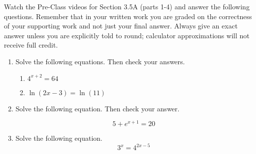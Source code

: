 


\noindent Watch the Pre-Class videos for Section 3.5A (parts 1-4) and answer the following questions. Remember that in your written work you are graded on the correctness of your supporting work and not just your final answer. Always give an exact answer unless you are explicitly told to round; calculator approximations will not receive full credit. 


\begin{enumerate}
\item Solve the following equations.  Then check your answers.
\begin{enumerate}
\item $\displaystyle 4^{x+2}=64$
\vfill
\item $\ln(2x-3)=\ln(11)$
\vfill
\end{enumerate}


\item Solve the following equation.  Then check your answer.

 $$\displaystyle 5+e^{x+1}=20$$


\vfill
\vfill

\newpage

\item Solve the following equation.
$$3^x=4^{2x-5}$$



\end{enumerate}



